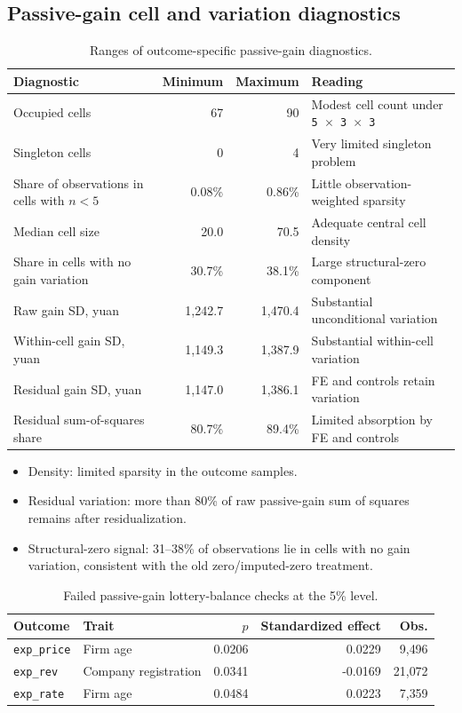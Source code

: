 \documentclass[11pt,letterpaper,english,final]{article}
\begin{document}
\subsection{Passive-gain cell and variation diagnostics}

\begin{table}[H]
\centering
\small
\setlength{\tabcolsep}{5pt}
\caption{Ranges of outcome-specific passive-gain diagnostics.}
\label{tab:passive_gain_variation_diag_20260920}
\begin{tabularx}{\textwidth}{p{4.8cm}rrX}
\toprule
Diagnostic & Minimum & Maximum & Reading \\
\midrule
Occupied cells & 67 & 90 & Modest cell count under \texttt{5 $\times$ 3 $\times$ 3} \\
Singleton cells & 0 & 4 & Very limited singleton problem \\
Share of observations in cells with $n<5$ & 0.08\% & 0.86\% & Little observation-weighted sparsity \\
Median cell size & 20.0 & 70.5 & Adequate central cell density \\
Share in cells with no gain variation & 30.7\% & 38.1\% & Large structural-zero component \\
Raw gain SD, yuan & 1{,}242.7 & 1{,}470.4 & Substantial unconditional variation \\
Within-cell gain SD, yuan & 1{,}149.3 & 1{,}387.9 & Substantial within-cell variation \\
Residual gain SD, yuan & 1{,}147.0 & 1{,}386.1 & FE and controls retain variation \\
Residual sum-of-squares share & 80.7\% & 89.4\% & Limited absorption by FE and controls \\
\bottomrule
\end{tabularx}
\end{table}

\begin{itemize}
\item Density: limited sparsity in the outcome samples.
\item Residual variation: more than 80\% of raw passive-gain sum of squares remains after residualization.
\item Structural-zero signal: 31--38\% of observations lie in cells with no gain variation, consistent with the old zero/imputed-zero treatment.
\end{itemize}

\begin{table}[H]
\centering
\small
\setlength{\tabcolsep}{7pt}
\caption{Failed passive-gain lottery-balance checks at the 5\% level.}
\label{tab:passive_gain_balance_failures_20260920}
\begin{tabular}{llrrr}
\toprule
Outcome & Trait & $p$ & Standardized effect & Obs. \\
\midrule
\texttt{exp\_price} & Firm age & 0.0206 & 0.0229 & 9{,}496 \\
\texttt{exp\_rev} & Company registration & 0.0341 & -0.0169 & 21{,}072 \\
\texttt{exp\_rate} & Firm age & 0.0484 & 0.0223 & 7{,}359 \\
\bottomrule
\end{tabular}
\end{table}
\end{document}
